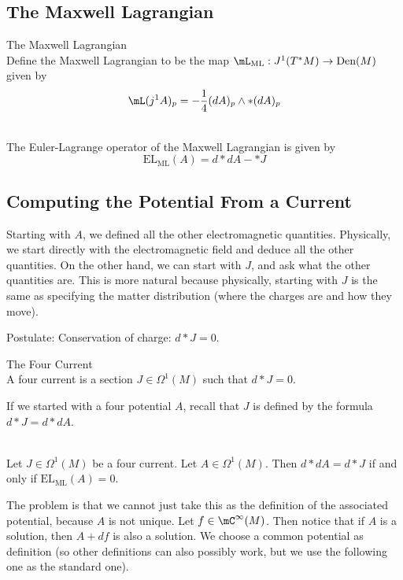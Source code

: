 \documentclass[a4paper]{article}
\begin{document}
\subsection{The Maxwell Lagrangian}
\begin{defn}{The Maxwell Lagrangian}{}\\
Define the Maxwell Lagrangian to be the map $\mL_\text{ML}:J^1(T^\ast M)\to\text{Den}(M)$ given by $$\mL(j^1A)_p=-\frac{1}{4}(dA)_p\wedge\ast(dA)_p$$
\end{defn}

\begin{prp}{}{}\\
The Euler-Lagrange operator of the Maxwell Lagrangian is given by $$\text{EL}_\text{ML}(A)=d\ast dA-\ast J$$
\end{prp}

\subsection{Computing the Potential From a Current}
Starting with $A$, we defined all the other electromagnetic quantities. Physically, we start directly with the electromagnetic field and deduce all the other quantities. On the other hand, we can start with $J$, and ask what the other quantities are. This is more natural because physically, starting with $J$ is the same as specifying the matter distribution (where the charges are and how they move). 

Postulate: Conservation of charge: $d\ast J=0$. 

\begin{defn}{The Four Current}{}\\
A four current is a section $J\in\Omega^1(M)$ such that $d\ast J=0$. 
\end{defn}

If we started with a four potential $A$, recall that $J$ is defined by the formula $d\ast J=d\ast dA$. 

\begin{prp}{}{}\\
Let $J\in\Omega^1(M)$ be a four current. Let $A\in\Omega^1(M)$. Then $d\ast dA=d\ast J$ if and only if $\text{EL}_\text{ML}(A)=0$. 
\end{prp}

The problem is that we cannot just take this as the definition of the associated potential, because $A$ is not unique. Let $f\in\mC^\infty(M)$. Then notice that if $A$ is a solution, then $A+df$ is also a solution. We choose a common potential as definition (so other definitions can also possibly work, but we use the following one as the standard one). 
\end{document}

